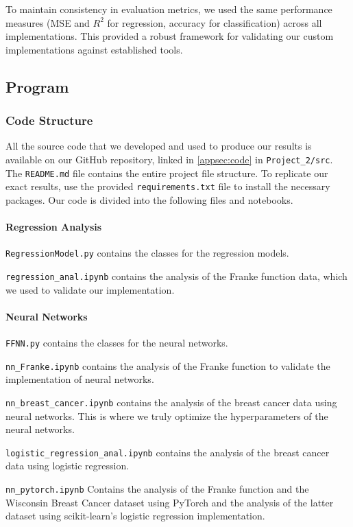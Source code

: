 To maintain consistency in evaluation metrics, we used the same performance measures (MSE and $R^2$ for regression, accuracy for classification) across all implementations. This provided a robust framework for validating our custom implementations against established tools.

\subsection{Program}\label{sec:program}
\subsubsection{Code Structure}\label{subsec:codestructure}
All the source code that we developed and used to produce our results is available on our GitHub repository, linked in \cref{appsec:code} in \verb|Project_2/src|. The \verb|README.md| file contains the entire project file structure. To replicate our exact results, use the provided \verb|requirements.txt| file to install the necessary packages. Our code is divided into the following files and notebooks.

\paragraph*{Regression Analysis}
\verb|RegressionModel.py| contains the classes for the regression models.

\verb|regression_anal.ipynb| contains the analysis of the Franke function data, which we used to validate our implementation.

\paragraph*{Neural Networks}
\verb|FFNN.py| contains the classes for the neural networks.

\verb|nn_Franke.ipynb| contains the analysis of the Franke function to validate the implementation of neural networks.

\verb|nn_breast_cancer.ipynb| contains the analysis of the breast cancer data using neural networks. This is where we truly optimize the hyperparameters of the neural networks.

\verb|logistic_regression_anal.ipynb| contains the analysis of the breast cancer data using logistic regression.

\verb|nn_pytorch.ipynb| Contains the analysis of the Franke function and the Wisconsin Breast Cancer dataset using PyTorch and the analysis of the latter dataset using scikit-learn's logistic regression implementation.

